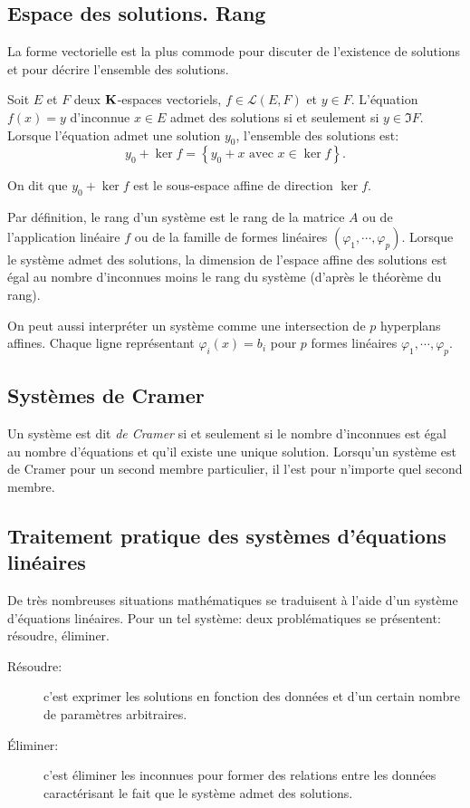 \subsection{Espace des solutions. Rang}
La forme vectorielle est la plus commode pour discuter de l'existence de solutions et pour décrire l'ensemble des solutions.
\begin{prop}
 Soit $E$ et $F$ deux $\mathbf{K}$-espaces vectoriels, $f\in\mathcal L(E,F)$ et $y \in F$.\newline
 L'équation $f(x)=y$ d'inconnue $x\in E$ admet des solutions si et seulement si $y\in \Im F$.\newline
 Lorsque l'équation admet une solution $y_0$, l'ensemble des solutions est:
\begin{displaymath}
 y_0 + \ker f = \left\lbrace y_0 + x \text{ avec } x \in \ker f \right\rbrace. 
\end{displaymath}
\end{prop}
\begin{rem}
 On dit que $y_0 + \ker f$ est le sous-espace affine de direction $\ker f$. 
\end{rem}

Par définition, le rang d'un système est le rang de la matrice $A$ ou de l'application linéaire $f$ ou de la famille de formes linéaires $(\varphi_1,\cdots,\varphi_p)$.\newline
Lorsque le système admet des solutions, la dimension de l'espace affine des solutions est égal au nombre d'inconnues moins le rang du système (d'après le théorème du rang).
\begin{rem}
 On peut aussi interpréter un système comme une intersection de $p$ hyperplans affines. Chaque ligne représentant $\varphi_i(x)=b_i$ pour $p$ formes linéaires $\varphi_1,\cdots,\varphi_p$.
\end{rem}

\subsection{Systèmes de Cramer}
Un système est dit \emph{de Cramer} si et seulement si le nombre d'inconnues est égal au nombre d'équations et qu'il existe une unique solution. Lorsqu'un système est de Cramer pour un second membre particulier, il l'est pour n'importe quel second membre.

\subsection{Traitement pratique des systèmes d'équations linéaires}
De très nombreuses situations mathématiques se traduisent à l'aide d'un système d'équations linéaires. Pour un tel système: deux problématiques se présentent: résoudre, éliminer. 
\begin{description}
 \item[Résoudre:] c'est exprimer les solutions en fonction des données et d'un certain nombre de paramètres arbitraires.
 \item[\'Eliminer:] c'est éliminer les inconnues pour former des relations entre les données caractérisant le fait que le système admet des solutions.
\end{description}


